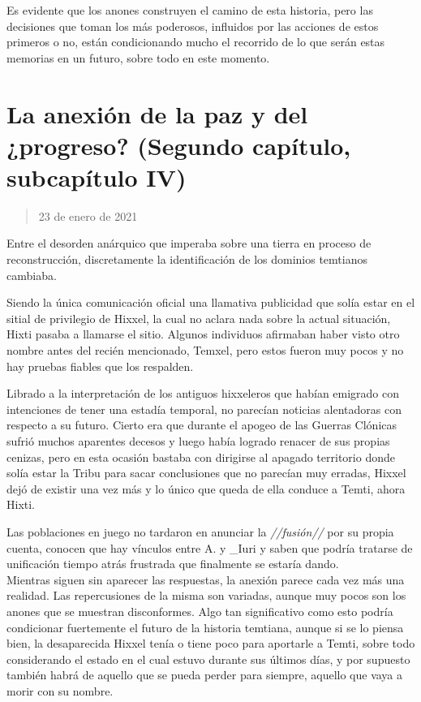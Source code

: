 \documentclass[
  spanish,
]{book}
\begin{document}
Es evidente que los anones construyen el camino de esta historia, pero las decisiones que toman los más poderosos, influidos por las acciones de estos primeros o no, están condicionando mucho el recorrido de lo que serán estas memorias en un futuro, sobre todo en este momento.

\hypertarget{la-anexiuxf3n-de-la-paz-y-del-progreso-segundo-capuxedtulo-subcapuxedtulo-iv}{%
\section{La anexión de la paz y del ¿progreso? (Segundo capítulo, subcapítulo IV)}\label{la-anexiuxf3n-de-la-paz-y-del-progreso-segundo-capuxedtulo-subcapuxedtulo-iv}}

\begin{quote}
23 de enero de 2021
\end{quote}

Entre el desorden anárquico que imperaba sobre una tierra en proceso de reconstrucción, discretamente la identificación de los dominios temtianos cambiaba.

Siendo la única comunicación oficial una llamativa publicidad que solía estar en el sitial de privilegio de Hixxel, la cual no aclara nada sobre la actual situación, Hixti pasaba a llamarse el sitio. Algunos individuos afirmaban haber visto otro nombre antes del recién mencionado, Temxel, pero estos fueron muy pocos y no hay pruebas fiables que los respalden.

Librado a la interpretación de los antiguos hixxeleros que habían emigrado con intenciones de tener una estadía temporal, no parecían noticias alentadoras con respecto a su futuro. Cierto era que durante el apogeo de las Guerras Clónicas sufrió muchos aparentes decesos y luego había logrado renacer de sus propias cenizas, pero en esta ocasión bastaba con dirigirse al apagado territorio donde solía estar la Tribu para sacar conclusiones que no parecían muy erradas, Hixxel dejó de existir una vez más y lo único que queda de ella conduce a Temti, ahora Hixti.

Las poblaciones en juego no tardaron en anunciar la \emph{//fusión//} por su propia cuenta, conocen que hay vínculos entre A. y \_Iuri y saben que podría tratarse de unificación tiempo atrás frustrada que finalmente se estaría dando.\\
Mientras siguen sin aparecer las respuestas, la anexión parece cada vez más una realidad. Las repercusiones de la misma son variadas, aunque muy pocos son los anones que se muestran disconformes. Algo tan significativo como esto podría condicionar fuertemente el futuro de la historia temtiana, aunque si se lo piensa bien, la desaparecida Hixxel tenía o tiene poco para aportarle a Temti, sobre todo considerando el estado en el cual estuvo durante sus últimos días, y por supuesto también habrá de aquello que se pueda perder para siempre, aquello que vaya a morir con su nombre.
\end{document}
